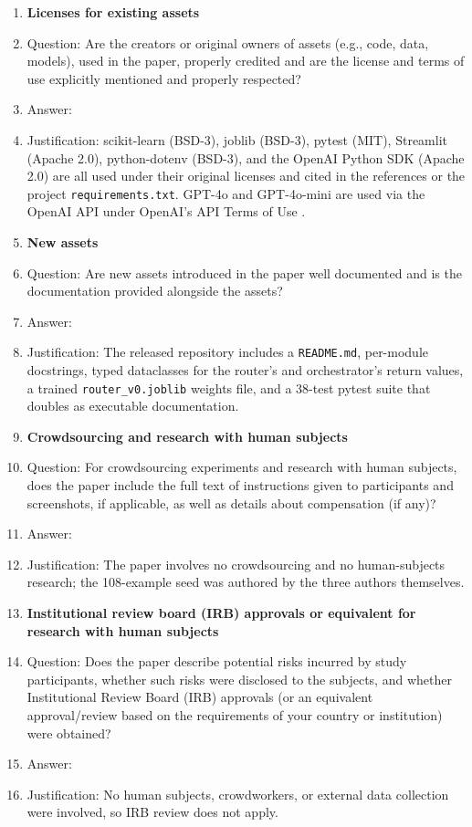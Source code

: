 \begin{enumerate}
\item {\bf Licenses for existing assets}
    \item[] Question: Are the creators or original owners of assets (e.g., code, data, models), used in the paper, properly credited and are the license and terms of use explicitly mentioned and properly respected?
    \item[] Answer: \answerYes{}
    \item[] Justification: scikit-learn (BSD-3), joblib (BSD-3), pytest (MIT), Streamlit (Apache 2.0), python-dotenv (BSD-3), and the OpenAI Python SDK (Apache 2.0) are all used under their original licenses and cited in the references or the project \texttt{requirements.txt}. GPT-4o and GPT-4o-mini are used via the OpenAI API under OpenAI's API Terms of Use \citep{openai_pricing_2024}.

\item {\bf New assets}
    \item[] Question: Are new assets introduced in the paper well documented and is the documentation provided alongside the assets?
    \item[] Answer: \answerYes{}
    \item[] Justification: The released repository includes a \texttt{README.md}, per-module docstrings, typed dataclasses for the router's and orchestrator's return values, a trained \texttt{router\_v0.joblib} weights file, and a 38-test pytest suite that doubles as executable documentation.

\item {\bf Crowdsourcing and research with human subjects}
    \item[] Question: For crowdsourcing experiments and research with human subjects, does the paper include the full text of instructions given to participants and screenshots, if applicable, as well as details about compensation (if any)?
    \item[] Answer: \answerNA{}
    \item[] Justification: The paper involves no crowdsourcing and no human-subjects research; the 108-example seed was authored by the three authors themselves.

\item {\bf Institutional review board (IRB) approvals or equivalent for research with human subjects}
    \item[] Question: Does the paper describe potential risks incurred by study participants, whether such risks were disclosed to the subjects, and whether Institutional Review Board (IRB) approvals (or an equivalent approval/review based on the requirements of your country or institution) were obtained?
    \item[] Answer: \answerNA{}
    \item[] Justification: No human subjects, crowdworkers, or external data collection were involved, so IRB review does not apply.


\end{enumerate}
